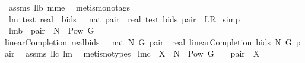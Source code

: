\begin{isabellebody}
%
\isadelimproof
%
\endisadelimproof
%
\isatagproof
{}\isamarkupfalse%
\ assms\ ll{}{}b\ mm{}{}e\ \isamarkupfalse%
\ {\isacharparenleft}metis{\isacharparenleft}mono{\isacharunderscore}tags{\isacharparenright}{\isacharparenright}%
\endisatagproof
{\isafoldproof}%
%
\isadelimproof
\isanewline
%
\endisadelimproof
\isanewline
{}\isamarkupfalse%
\ lm{}{}{}{\isacharcolon}\ {\isachardoublequoteopen}test\ {\isacharparenleft}real\ {\isasymcirc}\ {\isacharparenleft}{\isacharparenleft}bids{\isacharcolon}{\isacharcolon}\ {\isacharunderscore}\ {\isacharequal}{\isachargreater}\ nat{\isacharparenright}{\isacharparenright}{\isacharparenright}\ pair\ {\isacharequal}\ real\ {\isacharparenleft}test\ bids\ pair{\isacharparenright}{\isachardoublequoteclose}\ {\isacharparenleft}\ {\isachardoublequoteopen}{\isacharquery}L{\isacharequal}{\isacharquery}R{\isachardoublequoteclose}{\isacharparenright}\isanewline
%
\isadelimproof
%
\endisadelimproof
%
\isatagproof
{}\isamarkupfalse%
\ simp%
\endisatagproof
{\isafoldproof}%
%
\isadelimproof
\isanewline
%
\endisadelimproof
{}\isamarkupfalse%
\ lm{}{}{}b{\isacharcolon}\ \ {\isachardoublequoteopen}pair\ {\isasymin}\ N\ {\isasymtimes}\ {\isacharparenleft}Pow\ G{\isacharminus}{\isacharbraceleft}{\isacharbraceleft}{\isacharbraceright}{\isacharbraceright}{\isacharparenright}{\isachardoublequoteclose}\ \ \isanewline
{\isachardoublequoteopen}linearCompletion{\isacharprime}\ {\isacharparenleft}real{\isasymcirc}{\isacharparenleft}bids{\isacharcolon}{\isacharcolon}\ {\isacharunderscore}\ {\isacharequal}{\isachargreater}\ nat{\isacharparenright}{\isacharparenright}\ N\ G\ pair\ {\isacharequal}\ real\ {\isacharparenleft}linearCompletion{\isacharprime}\ bids\ N\ G\ pair{\isacharparenright}{\isachardoublequoteclose}\ \isanewline
%
\isadelimproof
%
\endisadelimproof
%
\isatagproof
{}\isamarkupfalse%
\ assms\ ll{}{}c\ lm{}{}{}\ \isamarkupfalse%
\ {\isacharparenleft}metis{\isacharparenleft}no{\isacharunderscore}types{\isacharparenright}{\isacharparenright}%
\endisatagproof
{\isafoldproof}%
%
\isadelimproof
\isanewline
%
\endisadelimproof
{}\isamarkupfalse%
\ lm{}{}{}c{\isacharcolon}\ \ {\isachardoublequoteopen}X\ {\isasymsubseteq}\ N\ {\isasymtimes}\ {\isacharparenleft}Pow\ G\ {\isacharminus}\ {\isacharbraceleft}{\isacharbraceleft}{\isacharbraceright}{\isacharbraceright}{\isacharparenright}{\isachardoublequoteclose}\ \ {\isachardoublequoteopen}{\isasymforall}pair\ {\isasymin}\ X{\isachardot}\ \isanewline

\end{isabellebody}
